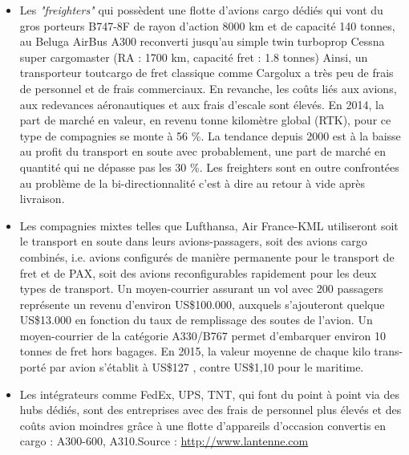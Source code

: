 \begin{itemize}
	\item Les \textit {"freighters"} qui possèdent une flotte d'avions cargo dédiés qui vont du gros porteurs B747-8F de rayon d'action 8000 km et de capacité 140 tonnes, au Beluga AirBus A300 reconverti jusqu'au simple twin turboprop Cessna super cargomaster (RA : 1700 km, capacité fret : 1.8 tonnes) Ainsi, un transporteur tout\-cargo de fret classique comme Cargolux a très peu de frais de personnel et de frais commerciaux. En revanche, les coûts liés aux avions, aux redevances aéronautiques et aux frais d’escale sont élevés. En 2014, la part de marché en valeur, en revenu tonne kilomètre global (RTK), pour ce type de compagnies se monte à 56 \%. La tendance depuis 2000 est à la baisse au profit du transport en soute avec probablement, une part de marché en quantité qui ne dépasse pas les 30 \%. Les freighters sont en outre confrontées au problème de la bi-directionnalité c'est à dire au retour à vide après livraison. 
	
	\item Les compagnies mixtes telles que Lufthansa, Air France-KML utiliseront soit le transport en soute dans leurs avions-passagers, soit des avions cargo combinés, i.e. avions configurés de manière permanente pour le transport de fret et de PAX, soit des avions reconfigurables rapidement pour les deux types de transport. Un moyen-courrier assurant un vol avec 200 passagers représente un revenu d’environ US\$100.000, auxquels s’ajouteront quelque US\$13.000 en fonction du taux de remplissage des soutes de l’avion. Un moyen-courrier de la catégorie A330/B767 permet d’embarquer environ 10 tonnes de fret hors bagages. En 2015, la valeur moyenne de chaque kilo trans-
	porté par avion s’établit à US\$127 , contre US\$1,10 pour le maritime. 
	
	\item Les intégrateurs comme FedEx, UPS, TNT, qui font du point à point via des hubs dédiés, sont des entreprises avec des frais de personnel plus élevés et des coûts avion moindres grâce à une flotte d'appareils d’occasion convertis en cargo : A300-600, A310.Source : \url{http://www.lantenne.com}
\end{itemize}

